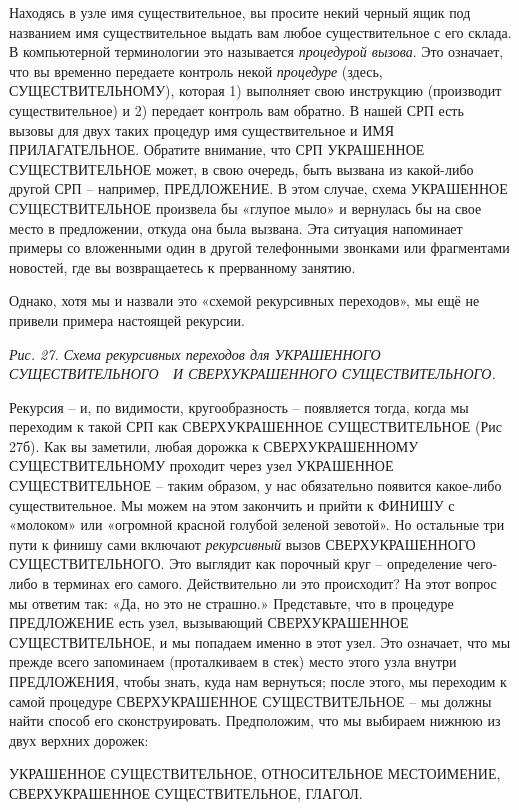 \documentclass[../main.tex]{subfiles}
\begin{document}
Находясь в узле имя существительное, вы просите некий черный ящик под названием имя существительное выдать вам любое существительное с его склада. В компьютерной терминологии это называется \emph{процедурой вызова}. Это означает, что вы временно передаете контроль некой \emph{процедуре} (здесь, СУЩЕСТВИТЕЛЬНОМУ), которая 1) выполняет свою инструкцию (производит существительное) и 2) передает контроль вам обратно. В нашей СРП есть вызовы для двух таких процедур имя существительное и ИМЯ ПРИЛАГАТЕЛЬНОЕ\@. Обратите внимание, что СРП УКРАШЕННОЕ СУЩЕСТВИТЕЛЬНОЕ может, в свою очередь, быть вызвана из какой-либо другой СРП \--- например, ПРЕДЛОЖЕНИЕ\@. В этом случае, схема УКРАШЕННОЕ СУЩЕСТВИТЕЛЬНОЕ произвела бы «глупое мыло» и вернулась бы на свое место в предложении, откуда она была вызвана. Эта ситуация напоминает примеры со вложенными один в другой телефонными звонками или фрагментами новостей, где вы возвращаетесь к прерванному занятию.

Однако, хотя мы и назвали это «схемой рекурсивных переходов», мы ещё не привели примера настоящей рекурсии.

\emph{Рис. 27. Схема рекурсивных переходов для УКРАШЕННОГО СУЩЕСТВИТЕЛЬНОГО~~И СВЕРХУКРАШЕННОГО СУЩЕСТВИТЕЛЬНОГО.}

Рекурсия \--- и, по видимости, кругообразность \--- появляется тогда, когда мы переходим к такой СРП как СВЕРХУКРАШЕННОЕ СУЩЕСТВИТЕЛЬНОЕ (Рис 27б). Как вы заметили, любая дорожка к СВЕРХУКРАШЕННОМУ СУЩЕСТВИТЕЛЬНОМУ проходит через узел УКРАШЕННОЕ СУЩЕСТВИТЕЛЬНОЕ \--- таким образом, у нас обязательно появится какое-либо существительное. Мы можем на этом закончить и прийти к ФИНИШУ с «молоком» или «огромной красной голубой зеленой зевотой». Но остальные три пути к финишу сами включают \emph{рекурсивный} вызов СВЕРХУКРАШЕННОГО СУЩЕСТВИТЕЛЬНОГО\@. Это выглядит как порочный круг \--- определение чего-либо в терминах его самого. Действительно ли это происходит? На этот вопрос мы ответим так: «Да, но это не страшно.» Представьте, что в процедуре ПРЕДЛОЖЕНИЕ есть узел, вызывающий СВЕРХУКРАШЕННОЕ СУЩЕСТВИТЕЛЬНОЕ, и мы попадаем именно в этот узел. Это означает, что мы прежде всего запоминаем (проталкиваем в стек) место этого узла внутри ПРЕДЛОЖЕНИЯ, чтобы знать, куда нам вернуться; после этого, мы переходим к самой процедуре СВЕРХУКРАШЕННОЕ СУЩЕСТВИТЕЛЬНОЕ \--- мы должны найти способ его сконструировать. Предположим, что мы выбираем нижнюю из двух верхних дорожек:

УКРАШЕННОЕ СУЩЕСТВИТЕЛЬНОЕ, ОТНОСИТЕЛЬНОЕ МЕСТОИМЕНИЕ, СВЕРХУКРАШЕННОЕ СУЩЕСТВИТЕЛЬНОЕ, ГЛАГОЛ.
\end{document}
